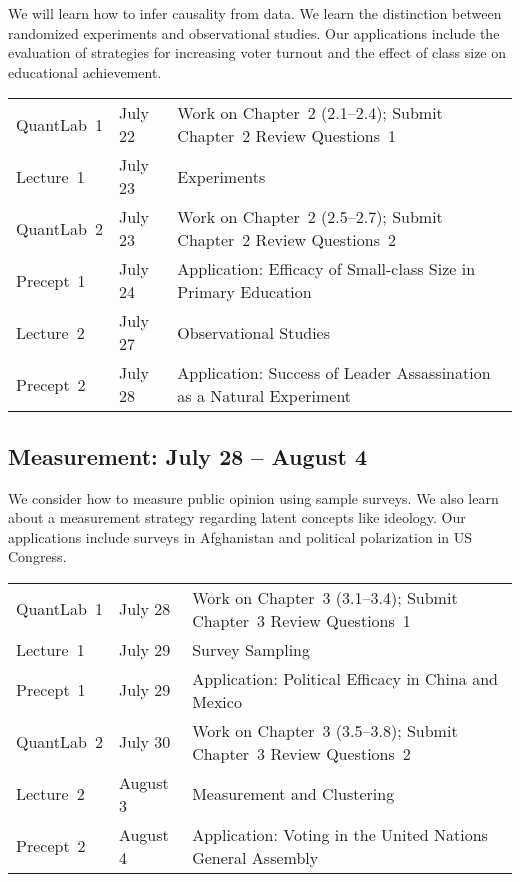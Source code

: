 \documentclass[11pt,letterpaper]{article}
\begin{document}
We will learn how to infer causality from data.  We learn the
distinction between randomized experiments and observational studies.
Our applications include the evaluation of strategies for increasing
voter turnout and the effect of class size on educational achievement.

\begin{center}
  \begin{tabular}{lll}
    \hline
    QuantLab~1 & July 22 & Work on Chapter~2 (2.1--2.4); Submit Chapter~2 Review Questions~1 \\
    Lecture~1  & July 23 & Experiments \\
    QuantLab~2 & July 23 & Work on Chapter~2 (2.5--2.7); Submit Chapter~2 Review Questions~2 \\
    Precept~1  & July 24 & Application: Efficacy of Small-class Size in Primary Education\\
    Lecture~2  & July 27 & Observational Studies \\
    Precept~2  & July 28 & Application: Success of Leader Assassination as a Natural Experiment \\
    \hline
  \end{tabular}
\end{center}

\bigskip 
\subsection*{Measurement: July 28 -- August 4}

We consider how to measure public opinion using sample surveys.  We
also learn about a measurement strategy regarding latent concepts like
ideology.  Our applications include surveys in Afghanistan and
political polarization in US Congress.

\begin{center}
  \begin{tabular}{lll}
    \hline
    QuantLab~1 & July 28 & Work on Chapter~3 (3.1--3.4); Submit Chapter~3 Review Questions~1 \\
    Lecture~1  & July 29 & Survey Sampling \\
    Precept~1  & July 29 & Application: Political Efficacy in China and Mexico\\
    QuantLab~2 & July 30 & Work on Chapter~3 (3.5--3.8); Submit Chapter~3 Review Questions~2 \\
    Lecture~2  & August 3 & Measurement and Clustering \\
    Precept~2  & August 4 & Application: Voting in the United Nations General Assembly
    \\
    \hline
  \end{tabular}
\end{center}
\end{document}
